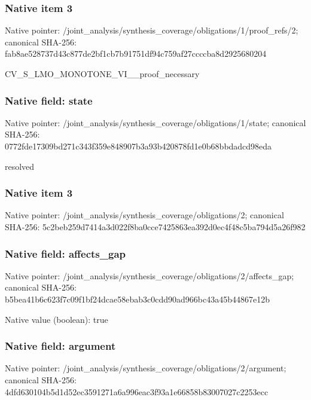 \documentclass[10pt,a4paper]{article}
\begin{document}
\subsubsection{Native item 3}
Native pointer: /joint\_\allowbreak{}analysis/synthesis\_\allowbreak{}coverage/obligations/1/proof\_\allowbreak{}refs/2; canonical SHA-256: fab8ae528737d43c877de2bf1cb7b91751df94c759af27ccccba8d2925680204

\begingroup\raggedright\sloppy CV\_\allowbreak{}S\_\allowbreak{}LMO\_\allowbreak{}MONOTONE\_\allowbreak{}VI\_\allowbreak{}\_\allowbreak{}proof\_\allowbreak{}necessary\par\endgroup

\subsubsection{Native field: state}
Native pointer: /joint\_\allowbreak{}analysis/synthesis\_\allowbreak{}coverage/obligations/1/state; canonical SHA-256: 0772fde17309bd271c343f359e848907b3a93b420878fd1e0b68bbdadcd98eda

\begingroup\raggedright\sloppy resolved\par\endgroup

\subsubsection{Native item 3}
Native pointer: /joint\_\allowbreak{}analysis/synthesis\_\allowbreak{}coverage/obligations/2; canonical SHA-256: 5c2beb259d7414a3d022f8ba0cce7425863ea392d0ec4f48c5ba794d5a26f982

\subsubsection{Native field: affects\_\allowbreak{}gap}
Native pointer: /joint\_\allowbreak{}analysis/synthesis\_\allowbreak{}coverage/obligations/2/affects\_\allowbreak{}gap; canonical SHA-256: b5bea41b6c623f7c09f1bf24dcae58ebab3c0cdd90ad966bc43a45b44867e12b

Native value (boolean): true

\subsubsection{Native field: argument}
Native pointer: /joint\_\allowbreak{}analysis/synthesis\_\allowbreak{}coverage/obligations/2/argument; canonical SHA-256: 4dfd630104b5d1d52ec3591271a6a996eac3f93a1e66858b83007027c2253ecc
\end{document}
